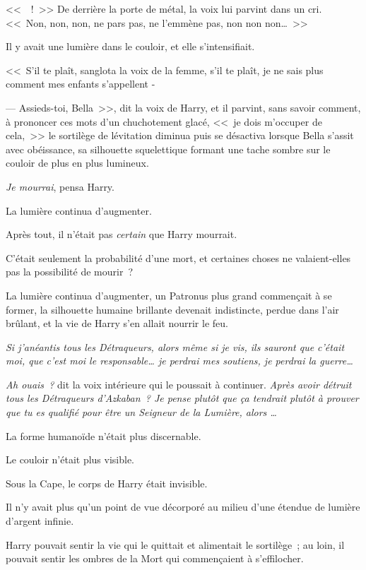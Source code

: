 <<~~!~>> De derrière la porte de métal, la voix lui parvint dans un cri. <<~Non, non, non, ne pars pas, ne l'emmène pas, non non non…~>>

Il y avait une lumière dans le couloir, et elle s'intensifiait.

<<~S'il te plaît, sanglota la voix de la femme, s'il te plaît, je ne sais plus comment mes enfants s'appellent -

--- Assieds-toi, Bella~>>, dit la voix de Harry, et il parvint, sans savoir comment, à prononcer ces mots d'un chuchotement glacé, <<~je dois m'occuper de cela,~>> le sortilège de lévitation diminua puis se désactiva lorsque Bella s'assit avec obéissance, sa silhouette squelettique formant une tache sombre sur le couloir de plus en plus lumineux.

\emph{Je mourrai}, pensa Harry.

La lumière continua d'augmenter.

Après tout, il n'était pas \emph{certain} que Harry mourrait.

C'était seulement la probabilité d'une mort, et certaines choses ne valaient-elles pas la possibilité de mourir~?

La lumière continua d'augmenter, un Patronus plus grand commençait à se former, la silhouette humaine brillante devenait indistincte, perdue dans l'air brûlant, et la vie de Harry s'en allait nourrir le feu.

\emph{Si j'anéantis tous les Détraqueurs, alors même si je vis, ils sauront que c'était moi, que c'est moi le responsable… je perdrai mes soutiens, je perdrai la guerre…}

\emph{Ah ouais~?} dit la voix intérieure qui le poussait à continuer. \emph{Après avoir détruit tous les Détraqueurs d'Azkaban~? Je pense plutôt que ça tendrait plutôt à prouver que tu es qualifié pour être un Seigneur de la Lumière, alors …}

La forme humanoïde n'était plus discernable.

Le couloir n'était plus visible.

Sous la Cape, le corps de Harry était invisible.

Il n'y avait plus qu'un point de vue décorporé au milieu d'une étendue de lumière d'argent infinie.

Harry pouvait sentir la vie qui le quittait et alimentait le sortilège~; au loin, il pouvait sentir les ombres de la Mort qui commençaient à s'effilocher.

